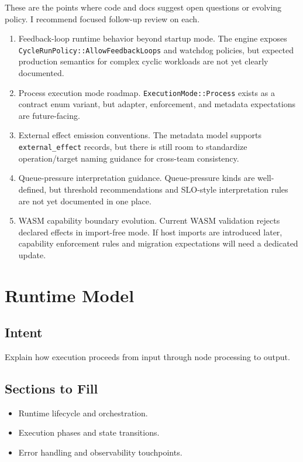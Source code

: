\documentclass[
  letterpaper,
]{report}
\providecommand{\tightlist}{%
  \setlength{\itemsep}{0pt}\setlength{\parskip}{0pt}}
\begin{document}
These are the points where code and docs suggest open questions or
evolving policy. I recommend focused follow-up review on each.

\begin{enumerate}
\def\labelenumi{\arabic{enumi}.}
\item
  Feedback-loop runtime behavior beyond startup mode. The engine exposes
  \texttt{CycleRunPolicy::AllowFeedbackLoops} and watchdog policies, but
  expected production semantics for complex cyclic workloads are not yet
  clearly documented.
\item
  Process execution mode roadmap. \texttt{ExecutionMode::Process} exists
  as a contract enum variant, but adapter, enforcement, and metadata
  expectations are future-facing.
\item
  External effect emission conventions. The metadata model supports
  \texttt{external\_effect} records, but there is still room to
  standardize operation/target naming guidance for cross-team
  consistency.
\item
  Queue-pressure interpretation guidance. Queue-pressure kinds are
  well-defined, but threshold recommendations and SLO-style
  interpretation rules are not yet documented in one place.
\item
  WASM capability boundary evolution. Current WASM validation rejects
  declared effects in import-free mode. If host imports are introduced
  later, capability enforcement rules and migration expectations will
  need a dedicated update.
\end{enumerate}


\chapter{Runtime Model}\label{runtime-model}

\section{Intent}\label{intent}

Explain how execution proceeds from input through node processing to
output.

\section{Sections to Fill}\label{sections-to-fill}

\begin{itemize}
\tightlist
\item
  Runtime lifecycle and orchestration.
\item
  Execution phases and state transitions.
\item
  Error handling and observability touchpoints.
\end{itemize}
\end{document}
